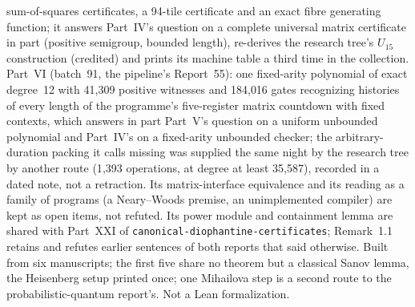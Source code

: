 \documentclass[11pt]{article}
\newcommand{\dir}[1]{\texttt{#1}}
\begin{document}
{sum-of-squares certificates, a 94-tile certificate and an exact fibre
generating function; it answers Part~IV's question on a complete universal
matrix certificate in part (positive semigroup, bounded length), re-derives
the research tree's $U_{15}$ construction (credited) and prints its machine
table a third time in the collection.  Part~VI (batch~91, the pipeline's
Report~55): one fixed-arity polynomial of exact degree~12 with 41{,}309
positive witnesses and 184{,}016 gates recognizing histories of every
length of the programme's five-register matrix countdown with fixed
contexts, which answers in part Part~V's question on a uniform unbounded
polynomial and Part~IV's on a fixed-arity unbounded checker; the
arbitrary-duration packing it calls missing was supplied the same night by
the research tree by another route (1{,}393 operations, at degree at least
35{,}587), recorded in a dated note, not a retraction.  Its matrix-interface
equivalence and its reading as a family of programs (a Neary--Woods
premise, an unimplemented compiler) are kept as open items, not refuted.
Its power module and containment lemma are shared with Part~XXI of
\dir{canonical-diophantine-certificates}; Remark~1.1 retains and refutes
earlier sentences of both reports that said otherwise.  Built from six
manuscripts; the first five share no theorem but a classical Sanov lemma, the Heisenberg setup printed
once; one Mihailova step is a second route to the probabilistic-quantum
report's.  Not a Lean formalization.}
\end{document}
